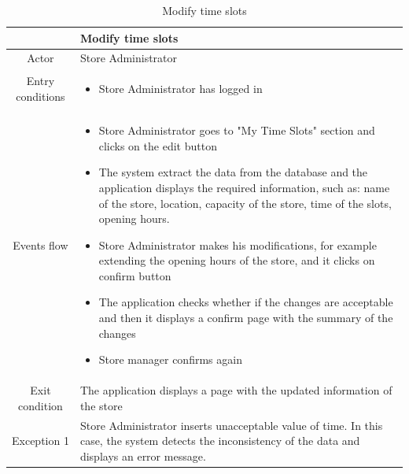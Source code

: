 \documentclass[table, 12pt]{article}
\begin{document}
\begin{longtable}{|c| p{10cm}|}
    \caption{Modify time slots}                                                                                                                                              \\
    \hline
                     & Modify time slots                                                                                                                                     \\
    \hline
    Actor            & Store Administrator                                                                                                                                   \\
    \hline
    Entry conditions & \begin{itemize}
        \item Store Administrator has logged in
    \end{itemize}                                                                                                                            \\
    \hline
    Events flow      & \begin{itemize}[nosep,after=\strut]
        \item Store Administrator goes to "My Time Slots" section and clicks on the edit button
        \item The system extract the data from the database and the application displays the required information, such as: name of the store, location, capacity of the store, time of the slots, opening hours.
        \item Store Administrator makes his modifications, for example extending the opening hours of the store, and it clicks on confirm button
        \item The application checks whether if the changes are acceptable and then it displays a confirm page with the summary of the changes
        \item Store manager confirms again
    \end{itemize}                                                                                                                            \\
    \hline
    Exit condition   & The application displays a page with the updated information of the store
    \\
    \hline
    \hline
    Exception 1      & Store Administrator inserts unacceptable value of time. In this case, the system detects the inconsistency of the data and displays an error message. \\
    \hline
\end{longtable}
\end{document}
